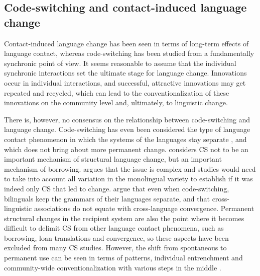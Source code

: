 \documentclass[output=paper]{langscibook}
\begin{document}
\subsection{Code-switching and contact-induced language change}\label{change}

Contact-induced language change has been seen in terms of long-term effects of language contact, whereas code-switching has been studied from a fundamentally synchronic point of view. It seems reasonable to assume that the individual synchronic interactions set the ultimate stage for language change. Innovations occur in individual interactions, and successful, attractive innovations may get repeated and recycled, which can lead to the conventionalization of these innovations on the community level and, ultimately, to linguistic change. 

There is, however, no consensus on the relationship between code-switching and language change.  Code-switching has even been considered the type of language contact phenomenon in which the systems of the languages stay separate \parencite{gardner2009code}, and which does not bring about more permanent change. \textcite{thomason2001contact} considers CS not to be an important mechanism of structural language change, but an important mechanism of borrowing. \textcite{backus2005codeswitching} argues that the issue is complex and studies would need to take into account all variation in the monolingual variety to establish if it was indeed only CS that led to change. \textcite{cacoullos2018bilingualism} argue that even when code-switching, bilinguals keep the grammars of their languages separate, and that cross-linguistic associations do not equate with cross-language convergence. Permanent structural changes in the recipient system are also the point where it becomes difficult to delimit CS from other language contact phenomena, such as borrowing, loan translations and convergence, so these aspects have been excluded from many CS studies. However, the shift from spontaneous to permanent use can be seen in terms of patterns, individual entrenchment and community-wide conventionalization with various steps in the middle \parencite{backus2013usage}. 
\end{document}
